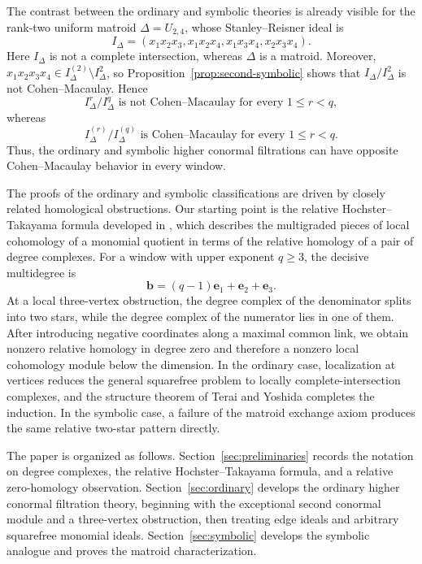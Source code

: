 \documentclass[12pt]{amsart}
\theoremstyle{plain}
\theoremstyle{definition}
\theoremstyle{remark}
\begin{document}
The contrast between the ordinary and symbolic theories is already visible
for the rank-two uniform matroid $\Delta=U_{2,4}$, whose Stanley--Reisner ideal
is
$$
I_\Delta=(x_1x_2x_3,x_1x_2x_4,x_1x_3x_4,x_2x_3x_4).
$$
Here $I_\Delta$ is not a complete intersection, whereas $\Delta$ is a matroid.
Moreover, $x_1x_2x_3x_4\in I_\Delta^{(2)}\setminus I_\Delta^2$, so
Proposition~\ref{prop:second-symbolic} shows that $I_\Delta/I_\Delta^2$ is not
Cohen--Macaulay. Hence
$$
I_\Delta^r/I_\Delta^q\text{ is not Cohen--Macaulay for every }1\le r<q,
$$
whereas
$$
I_\Delta^{(r)}/I_\Delta^{(q)}\text{ is Cohen--Macaulay for every }1\le r<q.
$$
Thus, the ordinary and symbolic higher conormal filtrations can have opposite
Cohen--Macaulay behavior in every window.

The proofs of the ordinary and symbolic classifications are driven by closely
related homological obstructions. Our starting point is the relative
Hochster--Takayama formula developed in \cite{HaMinh}, which describes the
multigraded pieces of local cohomology of a monomial quotient in terms of the
relative homology of a pair of degree complexes. For a window with upper
exponent $q\ge3$, the decisive multidegree is
$$
\mathbf b=(q-1)\mathbf e_1+\mathbf e_2+\mathbf e_3.
$$
At a local three-vertex obstruction, the degree complex of the denominator
splits into two stars, while the degree complex of the numerator lies in one
of them. After introducing negative coordinates along a maximal common link,
we obtain nonzero relative homology in degree zero and therefore a nonzero
local cohomology module below the dimension. In the ordinary case,
localization at vertices reduces the general squarefree problem to locally
complete-intersection complexes, and the structure theorem of Terai and
Yoshida \cite{TeraiYoshida} completes the induction. In the symbolic case, a
failure of the matroid exchange axiom produces the same relative two-star
pattern directly.

The paper is organized as follows. Section~\ref{sec:preliminaries} records the
notation on degree complexes, the relative Hochster--Takayama formula, and a
relative zero-homology observation. Section~\ref{sec:ordinary} develops the
ordinary higher conormal filtration theory, beginning with the exceptional
second conormal module and a three-vertex obstruction, then treating edge
ideals and arbitrary squarefree monomial ideals. Section~\ref{sec:symbolic}
develops the symbolic analogue and proves the matroid characterization.

\medskip
\end{document}
